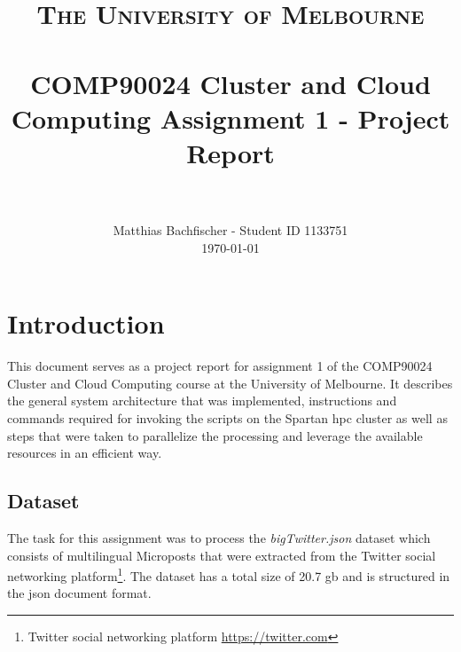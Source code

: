 \documentclass[paper=a4, fontsize=11pt]{scrartcl}
\title{
		\usefont{OT1}{bch}{b}{n}
		\normalfont \normalsize \textsc{The University of Melbourne} \\ [15pt]
		\horrule{0.5pt} \\[0.1cm]
		\huge COMP90024 Cluster and Cloud Computing Assignment 1 - Project Report \\
		\horrule{2pt} \\[0.1cm]
}
\author{
		\normalfont 								\normalsize
        Matthias Bachfischer - Student ID 1133751\\[-3pt]		\normalsize
        \today
}
\date{}
\numberwithin{equation}{section}		%
\numberwithin{figure}{section}			%
\numberwithin{table}{section}				%
\begin{document}
\maketitle
\section{Introduction}
This document serves as a project report for assignment 1 of the COMP90024 Cluster and Cloud Computing course at the University of Melbourne. It describes the general system architecture that was implemented, instructions and commands required for invoking the scripts on the Spartan \acrfull{hpc} cluster as well as steps that were taken to parallelize the processing and leverage the available resources in an efficient way.

\subsection{Dataset}
\label{dataset}
The task for this assignment was to process the \emph{bigTwitter.json} dataset which consists of multilingual Microposts that were extracted from the Twitter social networking platform\footnote{Twitter social networking platform \url{https://twitter.com}}. The dataset has a total size of 20.7 \acrfull{gb} and is structured in the \acrfull{json} document format.
\end{document}
